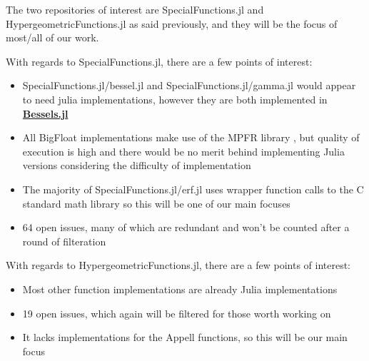 \documentclass{article}
\theoremstyle{mytheoremstyle}
\theoremstyle{mytheoremstyle}
\theoremstyle{myproblemstyle}
\begin{document}
      The two repositories of interest are SpecialFunctions.jl and HypergeometricFunctions.jl as said previously, and they will be the focus of most/all of our work. 

      With regards to SpecialFunctions.jl, there are a few points of interest: \begin{itemize}
        \item SpecialFunctions.jl/bessel.jl and SpecialFunctions.jl/gamma.jl would appear to need julia implementations, however they are both implemented in \href{https://github.com/JuliaMath/Bessels.jl/tree/master}{\textbf{Bessels.jl}} 
        \item All BigFloat implementations make use of the MPFR library \cite{mpfr}, but quality of execution is high and there would be no merit behind implementing Julia versions considering the difficulty of implementation
        \item The majority of SpecialFunctions.jl/erf.jl uses wrapper function calls to the C standard math library \cite{gnu clib} so this will be one of our main focuses
        \item 64 open issues, many of which are redundant and won't be counted after a round of filteration 
      \end{itemize}

      With regards to HypergeometricFunctions.jl, there are a few points of interest: \begin{itemize}
        \item Most other function implementations are already Julia implementations
        \item 19 open issues, which again will be filtered for those worth working on 
        \item It lacks implementations for the Appell functions, so this will be our main focus
      \end{itemize}
\end{document}
